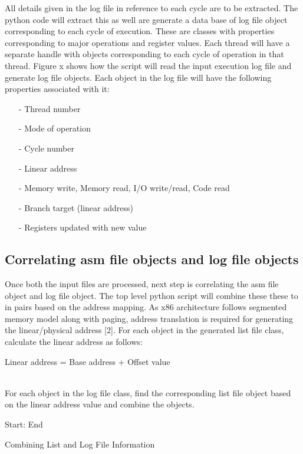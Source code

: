All details given in the log file in reference to each cycle are to be extracted. The python code will extract this as well are generate a data base of log file object corresponding to each cycle of execution. These are classes with properties corresponding to major operations and register values. Each thread will have a separate handle with objects corresponding to each cycle of operation in that thread. Figure x shows how the script will read the input execution log file and generate log file objects.
Each object in the log file will have the following properties associated with it:

\begin{itemize}
 \item[-] Thread number
 \item[-]  Mode of operation
 \item[-]  Cycle number
 \item[-]  Linear address
 \item[-]  Memory write, Memory read, I/O write/read, Code read
 \item[-]  Branch target (linear address)
 \item[-]  Registers updated with new value
\end{itemize}


\subsection {Correlating asm file objects and log file objects}

Once both the input files are processed, next step is correlating the asm file object and log file object. The top level python script will combine these these to in pairs based on the address mapping. As x86 architecture follows segmented memory model along with paging, address translation is required for generating the linear/physical address [2]. For each object in the generated list file class, calculate the linear address as follows:
\\
\centerline{Linear address = Base address + Offset value}
\\
For each object in the log file class, find the corresponding list file object based on the linear address value and combine the objects.


\vspace{1.5cm}

\IncMargin{1em}
\begin{algorithm}[H]
\DontPrintSemicolon
{} 

\BlankLine
Start: \;
End \;
\caption{Combining List and Log File Information}
\end{algorithm}\DecMargin{1em}

